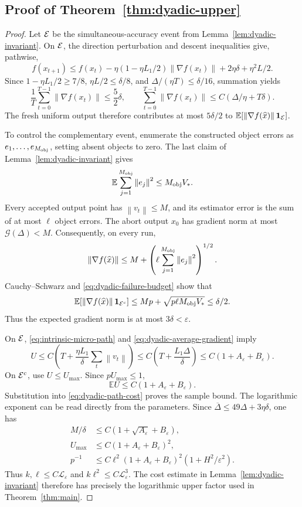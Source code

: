 \documentclass[11pt,a4paper]{article}
\newcommand{\E}{\mathbb{E}}
\newcommand{\eps}{\varepsilon}
\newcommand{\norm}[1]{\left\lVert #1\right\rVert}
\theoremstyle{remark}
\begin{document}
\subsection{Proof of Theorem~\ref{thm:dyadic-upper}}

\begin{proof}
Let ${\cal E}$ be the simultaneous-accuracy event from
Lemma~\ref{lem:dyadic-invariant}.  On ${\cal E}$, the direction perturbation
and descent inequalities give, pathwise,
\[
 f(x_{t+1})\le f(x_t)
 -\eta(1-\eta L_1/2)\norm{\nabla f(x_t)}
 +2\eta\delta+\eta^2L/2.
\]
Since $1-\eta L_1/2\ge7/8$, $\eta L/2\le\delta/8$, and
$\Delta/(\eta T)\le\delta/16$, summation yields
\begin{equation}
 \frac1T\sum_{t=0}^{T-1}\norm{\nabla f(x_t)}\le\frac52\delta,
 \qquad
 \sum_{t=0}^{T-1}\norm{\nabla f(x_t)}
       \le C(\Delta/\eta+T\delta).
 \label{eq:dyadic-average-gradient}
\end{equation}
The fresh uniform output therefore contributes at most $5\delta/2$ to
$\E[\norm{\nabla f(\widehat x)}\mathbf1_{\cal E}]$.

To control the complementary event, enumerate the constructed object errors
as $e_1,\ldots,e_{M_{\rm obj}}$, setting absent objects to zero.  The last
claim of Lemma~\ref{lem:dyadic-invariant} gives
\[
 \E\sum_{j=1}^{M_{\rm obj}}\norm{e_j}^2\le M_{\rm obj}V_*.
\]
Every accepted output point has $\norm{v_t}\le M$, and its estimator error
is the sum of at most $\ell$ object errors.  The abort output $x_0$ has
gradient norm at most $\mathcal G(\Delta)<M$.  Consequently, on every run,
\[
 \norm{\nabla f(\widehat x)}
 \le M+\left(\ell\sum_{j=1}^{M_{\rm obj}}\norm{e_j}^2\right)^{1/2}.
\]
Cauchy--Schwarz and \eqref{eq:dyadic-failure-budget} show that
\[
 \E[\norm{\nabla f(\widehat x)}\mathbf1_{{\cal E}^c}]
 \le Mp+\sqrt{p\ell M_{\rm obj}V_*}\le\delta/2.
\]
Thus the expected gradient norm is at most $3\delta<\eps$.

On ${\cal E}$, \eqref{eq:intrinsic-micro-path} and
\eqref{eq:dyadic-average-gradient} imply
\[
 U\le C\left(T+\frac{\eta L_1}{\delta}
                 \sum_t\norm{v_t}\right)
 \le C\left(T+\frac{L_1\Delta}{\delta}\right)
 \le C(1+A_\eps+B_\eps).
\]
On ${\cal E}^c$, use $U\le U_{\max}$.  Since $pU_{\max}\le1$,
\begin{equation}
 \E U\le C(1+A_\eps+B_\eps).
 \label{eq:virtual-path-length}
\end{equation}
Substitution into \eqref{eq:dyadic-path-cost} proves the sample bound.
The logarithmic exponent can be read directly from the parameters. Since
$\overline\Delta\le49\Delta+3\eta\delta$, one has
\begin{align*}
 M/\delta&\le C(1+\sqrt{A_\eps}+B_\eps),\\
 U_{\max}&\le C(1+A_\eps+B_\eps)^2,\\
 p^{-1}&\le C\ell^2(1+A_\eps+B_\eps)^2
                   (1+H^2/\eps^2).
\end{align*}
Thus $k,\ell\le C\mathcal L_\eps$ and
$k\ell^2\le C\mathcal L_\eps^3$. The cost estimate in
Lemma~\ref{lem:dyadic-invariant} therefore has precisely the logarithmic
upper factor used in Theorem~\ref{thm:main}.


\end{proof}
\end{document}
